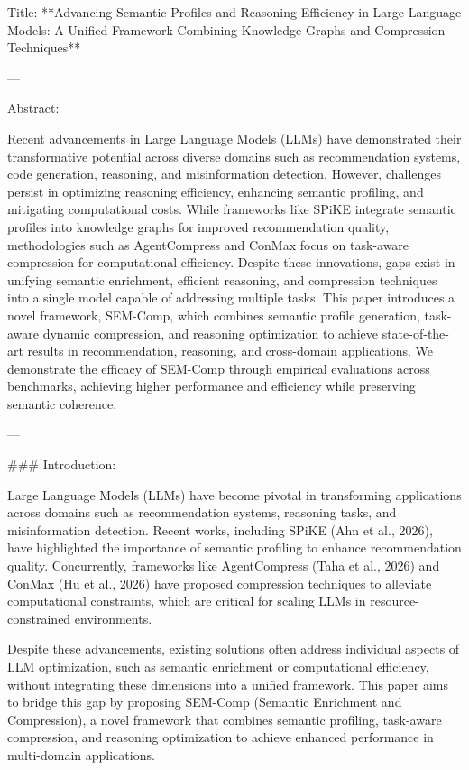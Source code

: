 Title: **Advancing Semantic Profiles and Reasoning Efficiency in Large Language Models: A Unified Framework Combining Knowledge Graphs and Compression Techniques**

---

Abstract:

Recent advancements in Large Language Models (LLMs) have demonstrated their transformative potential across diverse domains such as recommendation systems, code generation, reasoning, and misinformation detection. However, challenges persist in optimizing reasoning efficiency, enhancing semantic profiling, and mitigating computational costs. While frameworks like SPiKE integrate semantic profiles into knowledge graphs for improved recommendation quality, methodologies such as AgentCompress and ConMax focus on task-aware compression for computational efficiency. Despite these innovations, gaps exist in unifying semantic enrichment, efficient reasoning, and compression techniques into a single model capable of addressing multiple tasks. This paper introduces a novel framework, SEM-Comp, which combines semantic profile generation, task-aware dynamic compression, and reasoning optimization to achieve state-of-the-art results in recommendation, reasoning, and cross-domain applications. We demonstrate the efficacy of SEM-Comp through empirical evaluations across benchmarks, achieving higher performance and efficiency while preserving semantic coherence.

---

### Introduction:

Large Language Models (LLMs) have become pivotal in transforming applications across domains such as recommendation systems, reasoning tasks, and misinformation detection. Recent works, including SPiKE (Ahn et al., 2026), have highlighted the importance of semantic profiling to enhance recommendation quality. Concurrently, frameworks like AgentCompress (Taha et al., 2026) and ConMax (Hu et al., 2026) have proposed compression techniques to alleviate computational constraints, which are critical for scaling LLMs in resource-constrained environments.

Despite these advancements, existing solutions often address individual aspects of LLM optimization, such as semantic enrichment or computational efficiency, without integrating these dimensions into a unified framework. This paper aims to bridge this gap by proposing SEM-Comp (Semantic Enrichment and Compression), a novel framework that combines semantic profiling, task-aware compression, and reasoning optimization to achieve enhanced performance in multi-domain applications.

